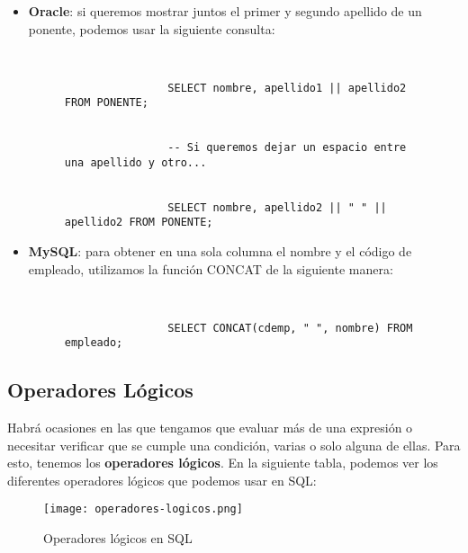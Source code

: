 \begin{itemize}
    \item \textbf{Oracle}: si queremos mostrar juntos el primer y segundo apellido de un ponente, podemos usar la siguiente consulta:

    \begin{figure}[h]
        \begin{tcolorbox}[sharp corners, colback=yellow!30, colframe=white!20]
            \scriptsize
            \begin{verbatim}


                SELECT nombre, apellido1 || apellido2 FROM PONENTE;


                -- Si queremos dejar un espacio entre una apellido y otro...


                SELECT nombre, apellido2 || " " || apellido2 FROM PONENTE;
            \end{verbatim}
        \end{tcolorbox}
    \end{figure}

    \item \textbf{MySQL}: para obtener en una sola columna el nombre y el código de empleado, utilizamos la función CONCAT de la siguiente manera:

    \begin{figure}[h]
        \begin{tcolorbox}[sharp corners, colback=yellow!30, colframe=white!20]
            \scriptsize
            \begin{verbatim}


                SELECT CONCAT(cdemp, " ", nombre) FROM empleado;
            \end{verbatim}
        \end{tcolorbox}
    \end{figure}
\end{itemize}

\subsection{Operadores Lógicos}
Habrá ocasiones en las que tengamos que evaluar más de una expresión o necesitar verificar que se cumple una condición, varias o solo alguna de ellas. Para esto, tenemos los \textbf{operadores lógicos}. En la siguiente tabla, podemos ver los diferentes operadores lógicos que podemos usar en SQL:

\begin{figure}[H]
    \centering
    \texttt{[image: operadores-logicos.png]}
    \caption{Operadores lógicos en SQL}
\end{figure}

